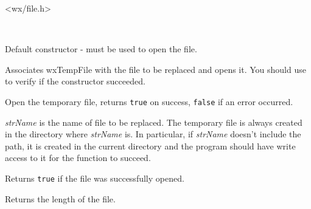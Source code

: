 
<wx/file.h>




\\


\label{wxtempfilewxtempfilector}


Default constructor -  must be used to open the
file.

\label{wxtempfilewxtempfile}


Associates wxTempFile with the file to be replaced and opens it. You should use 
 to verify if the constructor succeeded.

\label{wxtempfileopen}


Open the temporary file, returns {\tt true} on success, {\tt false} if an error
occurred.

{\it strName} is the name of file to be replaced. The temporary file is always
created in the directory where {\it strName} is. In particular, if 
{\it strName} doesn't include the path, it is created in the current directory
and the program should have write access to it for the function to succeed.

\label{wxtempfileisopened}


Returns {\tt true} if the file was successfully opened.

\label{wxtempfilelength}


Returns the length of the file.

\label{wxtempfileseek}


